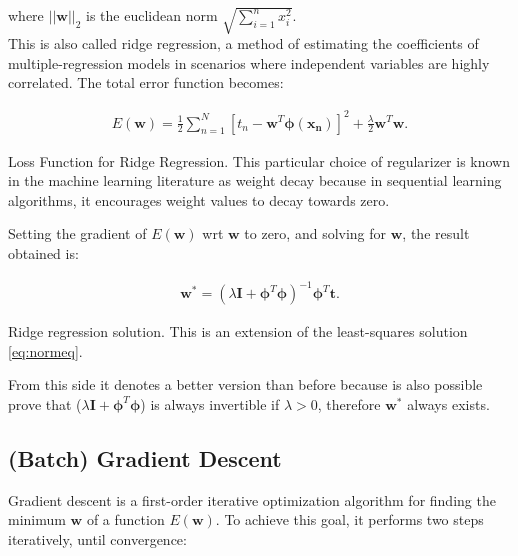 \noindent where $||\bm{w}||_2$ is the euclidean norm $\sqrt{ \sum_{i=1}^{n} x^2_i}$. \\

\noindent This is also called ridge regression, a method of estimating the coefficients of multiple-regression models in scenarios where independent variables are highly correlated. The total error function becomes:
\begin{Equation}[H]
	\centering
		\begin{equation} \label{eq:lossridgereg}
			\begin{aligned}
				E(\bm{w}) = \frac{1}{2} \sum_{n=1}^{N}[t_n - \bm{w}^T \bm{\phi}(\bm{x_n})]^2 + \frac{\lambda}{2} \bm{w}^T \bm{w} .
			\end{aligned}
		\end{equation}
		\caption[Loss Function for Ridge Regression]{Loss Function for Ridge Regression. This particular choice of regularizer is known in the machine learning literature as weight decay because in sequential learning algorithms, it encourages weight values to decay towards zero.}
\end{Equation}

\noindent Setting the gradient of $E(\bm{w})$ \gls{wrt} $\bm{w}$ to zero, and solving for $\bm{w}$, the result obtained is:

\begin{Equation}[H]
	\centering
		\begin{equation} \label{eq:least-square-stepf}
			\begin{aligned}
				\bm{w^*} = (\lambda \bm{I} + \bm{\phi}^T \bm{\phi})^{-1} \bm{\phi}^T \bm{t} .
			\end{aligned}
		\end{equation}
		\caption[Ridge regression solution.]{Ridge regression solution. This is an extension of the least-squares solution \ref{eq:normeq}.}
\end{Equation}

\noindent From this side it denotes a better version than before because is also possible prove that ($\lambda \bm{I} + \bm{\phi}^T \bm{\phi}$) is always invertible if $\lambda > 0$, therefore $\bm{w^*}$ always exists.

\subsection{(Batch) Gradient Descent}
\label{subsec:batchgradientdescen}
\noindent Gradient descent is a first-order iterative optimization algorithm for finding the minimum $\bm{w}$ of a function $E(\bm{w})$. To achieve this goal, it performs two steps iteratively, until convergence:

